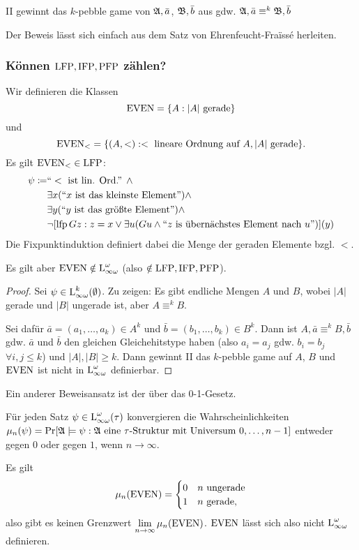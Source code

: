 \begin{satz}
	II gewinnt das $k$-pebble game von $\mathfrak{A},\bar{a}$, $\mathfrak{B},\bar{b}$ aus gdw. $\mathfrak{A},\bar{a}\equiv^k \mathfrak{B},\bar{b}$
\end{satz}
Der Beweis lässt sich einfach aus dem Satz von Ehrenfeucht-Fra\"iss\'e herleiten.

\subsubsection*{Können $\operatorname{LFP}, \operatorname{IFP}, \operatorname{PFP}$ zählen?}

Wir definieren die Klassen 
$$\operatorname{EVEN}=\{A : \vert A \vert \text{ gerade}\}$$ 
und $$\operatorname{EVEN}_<=\{(A,<) : < \text{ lineare Ordnung auf } A, \vert A\vert \text{ gerade}\}.$$
Es gilt $\operatorname{EVEN}_<\in \operatorname{LFP}$:
\begin{align*}
	\psi \coloneqq &\text{``}<\text{ ist lin. Ord.'' } \land\\
	&\exists x (\text{``}x\text{ ist das kleinste Element''}) \land \\
	& \exists y (\text{``}y\text{ ist das größte Element''}) \land \\
	&\neg[\operatorname{lfp} Gz : z=x \lor \exists u (Gu \land \text{``}z\text{ is übernächstes Element nach } u\text{''})](y)
\end{align*}
Die Fixpunktinduktion definiert dabei die Menge der geraden Elemente bzgl. $<$.

\begin{satz}
	Es gilt aber $\operatorname{EVEN}\notin \operatorname{L}_{\infty\omega}^\omega$ (also $\notin \operatorname{LFP},\operatorname{IFP},\operatorname{PFP}$).
\end{satz}
\begin{proof}
	Sei $\psi\in \operatorname{L}_{\infty\omega}^k(\emptyset)$. Zu zeigen: Es gibt endliche Mengen $A$ und $B$, wobei $\vert A \vert$ gerade und $\vert B\vert$ ungerade ist, aber $A \equiv^k B$.
	
	Sei dafür $\bar{a}=(a_1,\dots,a_k)\in A^k$ und $\bar{b}=(b_1,\dots,b_k)\in B^k$. Dann ist $A,\bar{a} \equiv^k B,\bar{b}$ gdw. $\bar{a}$ und $\bar{b}$ den gleichen Gleichehitstype haben (also $a_i=a_j$ gdw. $b_i=b_j$ $\forall i,j\leq k$) und $\vert A\vert, \vert B\vert \geq k$. Dann gewinnt II das $k$-pebble game auf $A$, $B$ und $\operatorname{EVEN}$ ist nicht in $\operatorname{L}_{\infty\omega}^\omega$ definierbar.
\end{proof}

Ein anderer Beweisansatz ist der über das 0-1-Gesetz.
\begin{satz}[0-1-Gesetz]
	Für jeden Satz $\psi\in \operatorname{L}_{\infty\omega}^\omega(\tau)$ konvergieren die Wahrscheinlichkeiten $\mu_n(\psi)=\Pr[\mathfrak{A}\models\psi : \mathfrak{A} \text{ eine } \tau\text{-Struktur mit Universum } {0,\dots,n-1}]$ entweder gegen $0$ oder gegen $1$, wenn $n\to\infty$.
\end{satz}
Es gilt 
$$\mu_n(\operatorname{EVEN})=\begin{cases} 0 & n \text{ ungerade} \\ 1 & n \text{ gerade},\end{cases}$$
also gibt es keinen Grenzwert $\lim\limits_{n\to\infty} \mu_n(\operatorname{EVEN})$. $\operatorname{EVEN}$ lässt sich also nicht $\operatorname{L}_{\infty\omega}^\omega$ definieren.

